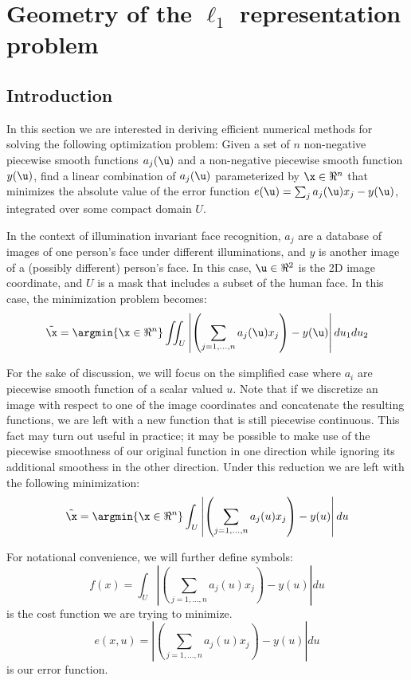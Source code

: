 \section{Geometry of the $\ell_1$ representation problem}

\subsection{Introduction} 
% 
In this section we are interested in deriving efficient numerical methods
for solving the following optimization problem:  Given a set of $n$
non-negative piecewise smooth functions $a_j(\u)$ and a non-negative piecewise
smooth function $y(\u)$,  find a linear combination of $a_j(\u)$ parameterized
by $\x \in \Re^n$ that minimizes the absolute value of the error function
$e(\u) = \sum_ja_j(\u) x_j - y(\u)$, integrated over some compact domain $U$.

In the context of illumination invariant
face recognition, $a_j$ are a database of images of one person's face
under different illuminations, and $y$ is another image of a (possibly
different) person's face.  In this case, $\u \in \Re^2$ is the 2D image
coordinate, and $U$ is a mask that includes a subset of the human face.  In
this case, the minimization problem becomes:
\begin{equation}\label{eqn:continuous2D} \tilde{\x} = \argmin{\x\in \Re^n}
\iint_U{\left|\left(\sum_{j=1,\ldots,n} a_j(\u) x_j\right) - y(\u)\right| du_1
du_2} \end{equation}

For the sake of discussion, we will focus on the simplified case where $a_i$
are piecewise smooth function of a scalar valued $u$.  Note that if we
discretize an image with respect to one of the image coordinates and
concatenate the resulting functions, we are left with a new function that is
still piecewise continuous.  This fact may turn out useful in practice; it may
be possible to make use of the piecewise smoothness of our original function in
one direction while ignoring its additional smoothess in the other direction.
Under this reduction we are left with the following minimization:
\begin{equation}\label{eqn:continuous1D}
\tilde{\x} = \argmin{\x\in \Re^n} \int_U{ \left|\left(\sum_{j=1,\ldots,n} a_j(u) x_j\right) - y(u)\right| du}
\end{equation}

For notational convenience, we will further define symbols:
\begin{equation}
 f(x) = \int_U{ \left|\left(\sum_{j=1,\ldots,n} a_j(u) x_j\right) - y(u)\right| du}
\end{equation}
is the cost function we are trying to minimize.
\begin{equation}
 e(x,u) = \left|\left(\sum_{j=1,\ldots,n} a_j(u) x_j\right) - y(u)\right| du
\end{equation}
is our error function.

